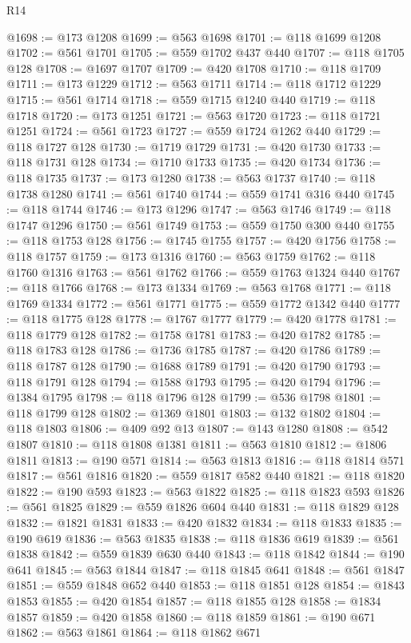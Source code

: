 \begin{lexlean}{R14}
\begin{coremodule}
{{{{{{{{{{{{{{{{{{{{{{{{{{{{{{{{{{{{{{{{{{{{{{{{{{{{{{{{{{{{{{{{{{{{{{{{{{{{{{{{{{@1698 := @173 @1208
@1699 := @563 @1698
@1701 := @118 @1699 @1208
@1702 := @561 @1701
@1705 := @559 @1702 @437 @440
@1707 := @118 @1705 @128
@1708 := @1697 @1707
@1709 := @420 @1708
@1710 := @118 @1709
@1711 := @173 @1229
@1712 := @563 @1711
@1714 := @118 @1712 @1229
@1715 := @561 @1714
@1718 := @559 @1715 @1240 @440
@1719 := @118 @1718
@1720 := @173 @1251
@1721 := @563 @1720
@1723 := @118 @1721 @1251
@1724 := @561 @1723
@1727 := @559 @1724 @1262 @440
@1729 := @118 @1727 @128
@1730 := @1719 @1729
@1731 := @420 @1730
@1733 := @118 @1731 @128
@1734 := @1710 @1733
@1735 := @420 @1734
@1736 := @118 @1735
@1737 := @173 @1280
@1738 := @563 @1737
@1740 := @118 @1738 @1280
@1741 := @561 @1740
@1744 := @559 @1741 @316 @440
@1745 := @118 @1744
@1746 := @173 @1296
@1747 := @563 @1746
@1749 := @118 @1747 @1296
@1750 := @561 @1749
@1753 := @559 @1750 @300 @440
@1755 := @118 @1753 @128
@1756 := @1745 @1755
@1757 := @420 @1756
@1758 := @118 @1757
@1759 := @173 @1316
@1760 := @563 @1759
@1762 := @118 @1760 @1316
@1763 := @561 @1762
@1766 := @559 @1763 @1324 @440
@1767 := @118 @1766
@1768 := @173 @1334
@1769 := @563 @1768
@1771 := @118 @1769 @1334
@1772 := @561 @1771
@1775 := @559 @1772 @1342 @440
@1777 := @118 @1775 @128
@1778 := @1767 @1777
@1779 := @420 @1778
@1781 := @118 @1779 @128
@1782 := @1758 @1781
@1783 := @420 @1782
@1785 := @118 @1783 @128
@1786 := @1736 @1785
@1787 := @420 @1786
@1789 := @118 @1787 @128
@1790 := @1688 @1789
@1791 := @420 @1790
@1793 := @118 @1791 @128
@1794 := @1588 @1793
@1795 := @420 @1794
@1796 := @1384 @1795
@1798 := @118 @1796 @128
@1799 := @536 @1798
@1801 := @118 @1799 @128
@1802 := @1369 @1801
@1803 := @132 @1802
@1804 := @118 @1803
@1806 := @409 @92 @13
@1807 := @143 @1280
@1808 := @542 @1807
@1810 := @118 @1808 @1381
@1811 := @563 @1810
@1812 := @1806 @1811
@1813 := @190 @571
@1814 := @563 @1813
@1816 := @118 @1814 @571
@1817 := @561 @1816
@1820 := @559 @1817 @582 @440
@1821 := @118 @1820
@1822 := @190 @593
@1823 := @563 @1822
@1825 := @118 @1823 @593
@1826 := @561 @1825
@1829 := @559 @1826 @604 @440
@1831 := @118 @1829 @128
@1832 := @1821 @1831
@1833 := @420 @1832
@1834 := @118 @1833
@1835 := @190 @619
@1836 := @563 @1835
@1838 := @118 @1836 @619
@1839 := @561 @1838
@1842 := @559 @1839 @630 @440
@1843 := @118 @1842
@1844 := @190 @641
@1845 := @563 @1844
@1847 := @118 @1845 @641
@1848 := @561 @1847
@1851 := @559 @1848 @652 @440
@1853 := @118 @1851 @128
@1854 := @1843 @1853
@1855 := @420 @1854
@1857 := @118 @1855 @128
@1858 := @1834 @1857
@1859 := @420 @1858
@1860 := @118 @1859
@1861 := @190 @671
@1862 := @563 @1861
@1864 := @118 @1862 @671
}}}}}}}}}}}}}}}}}}}}}}}}}}}}}}}}}}}}}}}}}}}}}}}}}}}}}}}}}}}}}}}}}}}}}}}}}}}}}}}}}}
\end{coremodule}
\end{lexlean}
